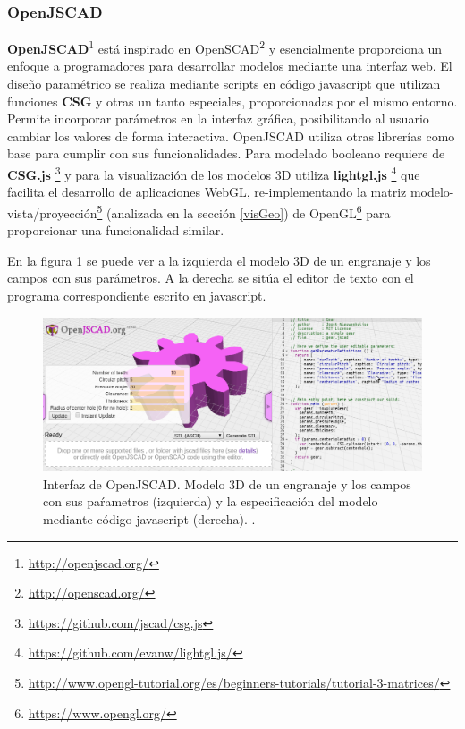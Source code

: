 \subsubsection{OpenJSCAD} 
\textbf{OpenJSCAD}\footnote{\url{http://openjscad.org/}} está inspirado en OpenSCAD\footnote{\url{http://openscad.org/}} y esencialmente proporciona un enfoque a programadores para desarrollar modelos mediante una interfaz web. El diseño paramétrico se realiza mediante scripts en código javascript \citep{flanagan2007javascript} que utilizan funciones \textbf{CSG} y otras un tanto especiales, proporcionadas por el mismo entorno.
Permite incorporar parámetros en la interfaz gráfica, posibilitando al usuario cambiar los  valores de forma interactiva. OpenJSCAD utiliza otras librerías como base para cumplir con sus funcionalidades. Para modelado booleano requiere de \textbf{CSG.js} \footnote{\url{https://github.com/jscad/csg.js}} y para la visualización de los modelos 3D  utiliza \textbf{lightgl.js}  \footnote{\url{https://github.com/evanw/lightgl.js/}} que facilita el desarrollo de aplicaciones WebGL, re-implementando la matriz modelo-vista/proyección\footnote{\url{http://www.opengl-tutorial.org/es/beginners-tutorials/tutorial-3-matrices/}} (analizada en   la sección \ref{visGeo}) de OpenGL\footnote{\url{https://www.opengl.org/}} para proporcionar una funcionalidad similar. 

En la figura \ref{fig:openjscad} se puede ver a la izquierda el modelo 3D de un engranaje y los campos con sus parámetros. A la derecha se sitúa el editor de texto con el programa correspondiente escrito en javascript.

\begin{figure}[h]
\includegraphics[width=14cm]{Img/openjscad-params.png}
\centering
\caption{\footnotesize{
Interfaz de OpenJSCAD. Modelo 3D de un engranaje y los campos con sus paŕametros  (izquierda) y la especificación del modelo mediante código javascript (derecha).
\citep{openJSCADorg}.}}
\label{fig:openjscad}
\end{figure}



